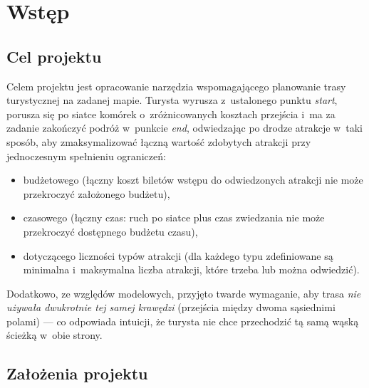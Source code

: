 \section{Wstęp}
\label{sec:wstep}

\subsection*{Cel projektu}

Celem projektu jest opracowanie narzędzia wspomagającego planowanie trasy
turystycznej na zadanej mapie. Turysta wyrusza z~ustalonego punktu \emph{start},
porusza się po siatce komórek o~zróżnicowanych kosztach przejścia i~ma za zadanie
zakończyć podróż w~punkcie \emph{end}, odwiedzając po drodze atrakcje w~taki sposób,
aby zmaksymalizować łączną wartość zdobytych atrakcji przy jednoczesnym spełnieniu
ograniczeń:

\begin{itemize}
    \item budżetowego (łączny koszt biletów wstępu do odwiedzonych atrakcji nie może
          przekroczyć założonego budżetu),
    \item czasowego (łączny czas: ruch po siatce plus czas zwiedzania nie może
          przekroczyć dostępnego budżetu czasu),
    \item dotyczącego liczności typów atrakcji (dla każdego typu zdefiniowane są
          minimalna i~maksymalna liczba atrakcji, które trzeba lub można odwiedzić).
\end{itemize}

Dodatkowo, ze względów modelowych, przyjęto twarde wymaganie, aby trasa
\emph{nie używała dwukrotnie tej samej krawędzi} (przejścia między dwoma sąsiednimi
polami) --- co odpowiada intuicji, że turysta nie chce przechodzić tą samą wąską
ścieżką w~obie strony.

\subsection*{Założenia projektu}

